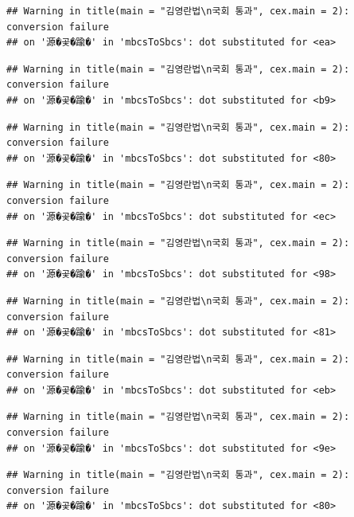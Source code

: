 \documentclass[
]{article}
\begin{document}
\begin{verbatim}
## Warning in title(main = "김영란법\n국회 통과", cex.main = 2): conversion failure
## on '源�곷�踰�' in 'mbcsToSbcs': dot substituted for <ea>
\end{verbatim}

\begin{verbatim}
## Warning in title(main = "김영란법\n국회 통과", cex.main = 2): conversion failure
## on '源�곷�踰�' in 'mbcsToSbcs': dot substituted for <b9>
\end{verbatim}

\begin{verbatim}
## Warning in title(main = "김영란법\n국회 통과", cex.main = 2): conversion failure
## on '源�곷�踰�' in 'mbcsToSbcs': dot substituted for <80>
\end{verbatim}

\begin{verbatim}
## Warning in title(main = "김영란법\n국회 통과", cex.main = 2): conversion failure
## on '源�곷�踰�' in 'mbcsToSbcs': dot substituted for <ec>
\end{verbatim}

\begin{verbatim}
## Warning in title(main = "김영란법\n국회 통과", cex.main = 2): conversion failure
## on '源�곷�踰�' in 'mbcsToSbcs': dot substituted for <98>
\end{verbatim}

\begin{verbatim}
## Warning in title(main = "김영란법\n국회 통과", cex.main = 2): conversion failure
## on '源�곷�踰�' in 'mbcsToSbcs': dot substituted for <81>
\end{verbatim}

\begin{verbatim}
## Warning in title(main = "김영란법\n국회 통과", cex.main = 2): conversion failure
## on '源�곷�踰�' in 'mbcsToSbcs': dot substituted for <eb>
\end{verbatim}

\begin{verbatim}
## Warning in title(main = "김영란법\n국회 통과", cex.main = 2): conversion failure
## on '源�곷�踰�' in 'mbcsToSbcs': dot substituted for <9e>
\end{verbatim}

\begin{verbatim}
## Warning in title(main = "김영란법\n국회 통과", cex.main = 2): conversion failure
## on '源�곷�踰�' in 'mbcsToSbcs': dot substituted for <80>
\end{verbatim}
\end{document}
